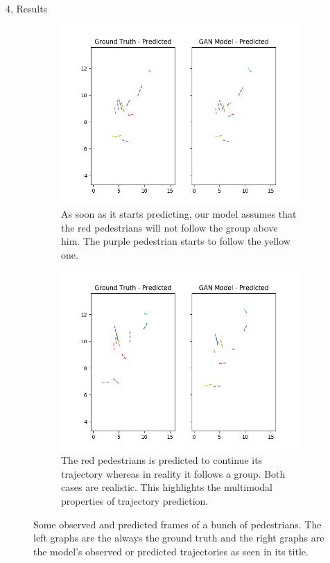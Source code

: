 \documentclass[10pt,a4paper]{article}
\begin{document}
\begin{task}{4, Results}
\begin{itemize}
\begin{figure}[H]
\begin{subfigure}[b]{0.475\textwidth}
\centering
\includegraphics[width=\textwidth]{pictures/frames/chaotic/frame_14.png}
\caption[]
{{\small As soon as it starts predicting, our model assumes that the red pedestrians will not follow the group above him. The purple pedestrian starts to follow the yellow one.}}
\label{fig:chaotic_3}
\end{subfigure}
\quad
\begin{subfigure}[b]{0.475\textwidth}
\centering
\includegraphics[width=\textwidth]{pictures/frames/chaotic/frame_18.png}
\caption[]
{{\small The red pedestrians is predicted to continue its trajectory whereas in reality it follows a group. Both cases are realistic. This highlights the multimodal properties of trajectory prediction.}}
\label{fig:chaotic_4}
\end{subfigure}
\caption{Some observed and predicted frames of a bunch of pedestrians. The left graphs are the always the ground truth and the right graphs are the model's observed or predicted trajectories as seen in its title.}
\label{fig:chaotic}
\end{figure}




\end{itemize}
\end{task}
\end{document}
